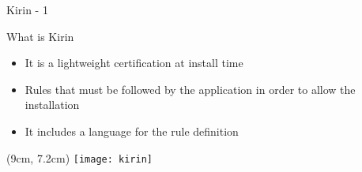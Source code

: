 \begin{frame}{Kirin - 1}

What is Kirin
\begin{center}
  \begin{itemize}
    \item It is a lightweight certification at install time

    \vfill

    \item Rules that must be followed by the application in order to allow the
    installation

    \vfill

    \item It includes a language for the rule definition
  \end{itemize}
\end{center}

\begin{textblock*}{1cm}(9cm, 7.2cm)
    \texttt{[image: kirin]}
\end{textblock*}

\end{frame}